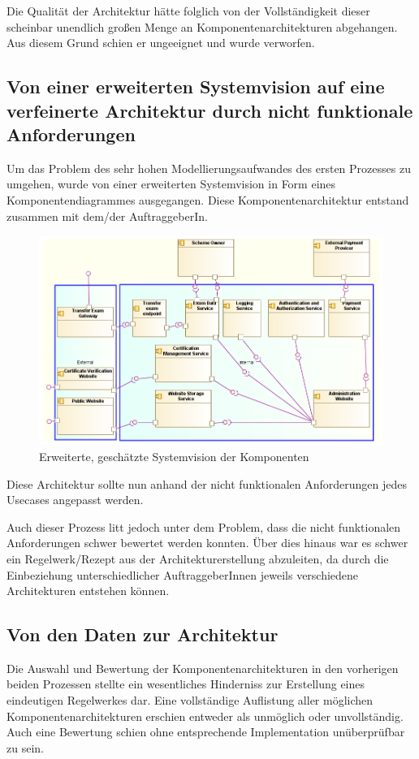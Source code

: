 Die Qualität der Architektur hätte folglich von der Vollständigkeit dieser scheinbar unendlich großen Menge an Komponentenarchitekturen abgehangen. Aus diesem Grund schien er ungeeignet und wurde verworfen.

\subsection{Von einer erweiterten Systemvision auf eine verfeinerte Architektur durch nicht funktionale Anforderungen}
Um das Problem des sehr hohen Modellierungsaufwandes des ersten Prozesses zu umgehen, wurde von einer erweiterten Systemvision in Form eines Komponentendiagrammes ausgegangen. Diese Komponentenarchitektur entstand zusammen mit dem/der AuftraggeberIn.

\begin{figure}[!htbp]
    \centering
    \includegraphics[scale=0.5]{uml/vision2.png}
    \caption{Erweiterte, geschätzte Systemvision der Komponenten}
\end{figure}

Diese Architektur sollte nun anhand der nicht funktionalen Anforderungen jedes Usecases angepasst werden.

Auch dieser Prozess litt jedoch unter dem Problem, dass die nicht funktionalen Anforderungen schwer bewertet werden konnten. Über dies hinaus war es schwer ein Regelwerk/Rezept aus der Architekturerstellung abzuleiten, da durch die Einbeziehung unterschiedlicher AuftraggeberInnen jeweils verschiedene Architekturen entstehen können.

\subsection{Von den Daten zur Architektur}
Die Auswahl und Bewertung der Komponentenarchitekturen in den vorherigen beiden Prozessen stellte ein wesentliches Hinderniss zur Erstellung eines eindeutigen Regelwerkes dar. Eine vollständige Auflistung aller möglichen Komponentenarchitekturen erschien entweder als unmöglich oder unvollständig. Auch eine Bewertung schien ohne entsprechende Implementation unüberprüfbar zu sein.

